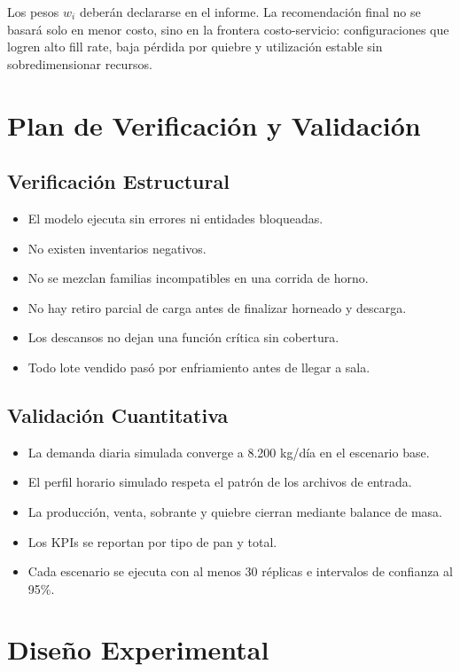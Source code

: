 \documentclass[11pt,letterpaper]{article}
\begin{document}
Los pesos \(w_i\) deberán declararse en el informe. La recomendación final no se basará solo en menor costo, sino en la frontera costo-servicio: configuraciones que logren alto fill rate, baja pérdida por quiebre y utilización estable sin sobredimensionar recursos.

\section{Plan de Verificación y Validación}

\subsection{Verificación Estructural}

\begin{itemize}
  \item El modelo ejecuta sin errores ni entidades bloqueadas.
  \item No existen inventarios negativos.
  \item No se mezclan familias incompatibles en una corrida de horno.
  \item No hay retiro parcial de carga antes de finalizar horneado y descarga.
  \item Los descansos no dejan una función crítica sin cobertura.
  \item Todo lote vendido pasó por enfriamiento antes de llegar a sala.
\end{itemize}

\subsection{Validación Cuantitativa}

\begin{itemize}
  \item La demanda diaria simulada converge a 8.200 kg/día en el escenario base.
  \item El perfil horario simulado respeta el patrón de los archivos de entrada.
  \item La producción, venta, sobrante y quiebre cierran mediante balance de masa.
  \item Los KPIs se reportan por tipo de pan y total.
  \item Cada escenario se ejecuta con al menos 30 réplicas e intervalos de confianza al 95\%.
\end{itemize}

\section{Diseño Experimental}
\end{document}
